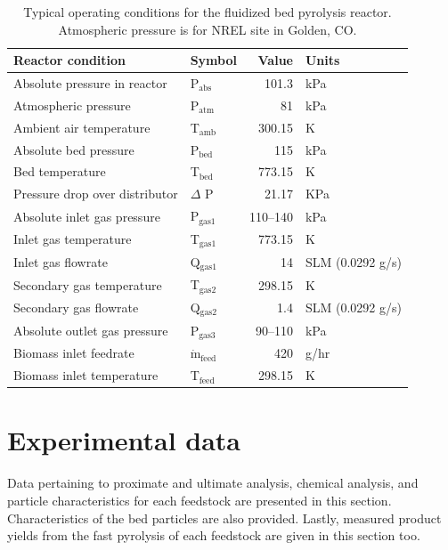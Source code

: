 \documentclass[12pt,titlepage]{article}
\begin{document}
\begin{table}[H]
    \centering
    \caption{Typical operating conditions for the fluidized bed pyrolysis reactor. Atmospheric pressure is for NREL site in Golden, CO.}
    \label{tab:operating}
    \begin{tabular}{llrl}
        \toprule
        Reactor condition & Symbol & Value & Units \\
        \midrule
        Absolute pressure in reactor   & P$_{\textrm{abs}}$  & 101.3     & kPa \\
        Atmospheric pressure           & P$_{\textrm{atm}}$  & 81        & kPa \\
        Ambient air temperature        & T$_{\textrm{amb}}$  & 300.15    & K \\
        Absolute bed pressure          & P$_{\textrm{bed}}$  & 115       & kPa  \\
        Bed temperature                & T$_{\textrm{bed}}$  & 773.15    & K \\
        Pressure drop over distributor & $\Delta$ P          & 21.17     & KPa \\
        Absolute inlet gas pressure    & P$_{\textrm{gas1}}$ & 110--140  & kPa \\
        Inlet gas temperature          & T$_{\textrm{gas1}}$ & 773.15    & K \\
        Inlet gas flowrate             & Q$_{\textrm{gas1}}$ & 14        & SLM (0.0292 g/s) \\
        Secondary gas temperature      & T$_{\textrm{gas2}}$ & 298.15    & K \\
        Secondary gas flowrate         & Q$_{\textrm{gas2}}$ & 1.4       & SLM (0.0292 g/s) \\
        Absolute outlet gas pressure   & P$_{\textrm{gas3}}$ & 90--110   & kPa \\
        Biomass inlet feedrate         & $\dot{{\textrm{m}}}_{\textrm{feed}}$ & 420 & g/hr \\
        Biomass inlet temperature      & T$_{\textrm{feed}}$ & 298.15    & K \\
        \bottomrule
    \end{tabular}
\end{table}

\section{Experimental data}

Data pertaining to proximate and ultimate analysis, chemical analysis, and particle characteristics for each feedstock are presented in this section. Characteristics of the bed particles are also provided. Lastly, measured product yields from the fast pyrolysis of each feedstock are given in this section too.
\end{document}

